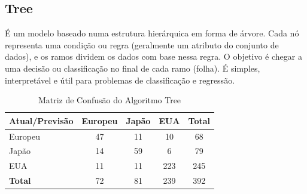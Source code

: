 \documentclass[conference]{IEEEtran}
\begin{document}
\subsection{Tree}
É um modelo baseado numa estrutura hierárquica em forma de árvore. Cada nó representa uma condição ou regra
(geralmente um atributo do conjunto de dados), e os ramos dividem os dados com base nessa regra. O objetivo
é chegar a uma decisão ou classificação no final de cada ramo (folha). É simples, interpretável e útil para
problemas de classificação e regressão.
\begin{table}[!ht]
	\centering
	\begin{tabular}{lcccc}
		\toprule
		\textbf{Atual/Previsão} & \textbf{Europeu} & \textbf{Japão} & \textbf{EUA} & \textbf{Total} \\
		\midrule
		Europeu                 & 47               & 11             & 10           & 68             \\
		Japão                   & 14               & 59             & 6            & 79             \\
		EUA                     & 11               & 11             & 223          & 245            \\
		\midrule
		\textbf{Total}          & 72               & 81             & 239          & 392            \\
		\bottomrule
	\end{tabular}
	\label{tab:conf_matrix_tree}
	\caption{Matriz de Confusão do Algoritmo Tree}
\end{table}

\end{document}
